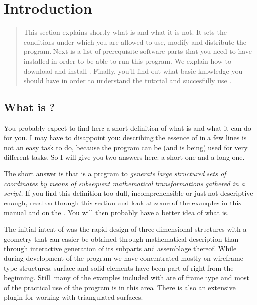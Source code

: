 
\chapter{Introduction}
\label{cha:introduction}

\ifhtml\begin{abstract}\fi
\noindent
This section explains shortly what \pyformex is and what it is not. It sets the conditions under which you are allowed to use, modify and distribute the program. Next is a list of prerequisite software parts that you need to have installed in order to be able to run this program. We explain how to download and install \pyformex. Finally, you'll find out what basic knowledge you should have in order to understand the tutorial and succesfully use \pyformex. 
\ifhtml\end{abstract}\fi


\section{What is \pyformex?}
\label{sec:what-pyformex}

You probably expect to find here a short definition of what \pyformex is and what it can do for you. I may have to disappoint you: describing the essence of \pyformex in a few lines is not an easy task to do, because the program can be (and is being) used for very different tasks. So I will give you two answers here: a short one and a long one.

The short answer is that \pyformex is a program to \emph{generate large structured sets of coordinates by means of subsequent mathematical transformations gathered in a script.}
If you find this definition too dull, incomprehensible or just not descriptive enough, read on through this section and look at some of the examples in this manual and on the . You will then probably have a better idea of what \pyformex{} is. 

The initial intent of \pyformex was the rapid design of three-dimensional structures with a geometry that can easier be obtained through mathematical description than through interactive generation of its subparts and assemblage thereof. While during development of the program we have concentrated mostly on wireframe type structures, surface and solid elements have been part of \pyformex right from the beginning. Still, many of the examples included with \pyformex are of frame type and most of the practical use of the program is in this area. There is also an extensive plugin for working with triangulated surfaces.

